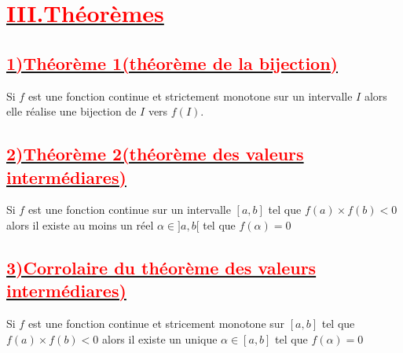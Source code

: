\documentclass[12pt]{article}
\begin{document}

            \section*{\underline{\textbf{\textcolor{red}{III.Théorèmes}}}}
            \subsection*{\underline{\textbf{\textcolor{red}{1)Théorème 1(théorème de la bijection)}}}}
            Si $f$ est une fonction continue et strictement monotone sur un intervalle $I$ alors elle réalise une bijection de $I$ vers $f(I)$.
            \subsection*{\underline{\textbf{\textcolor{red}{2)Théorème 2(théorème des valeurs intermédiares)}}}}
            Si $f$ est une fonction continue sur un intervalle $[a, b]$ tel que $f(a)\times f(b)<0$ alors il existe au moins un réel $\alpha\in ]a, b[$ tel que $f(\alpha)=0$
\subsection*{\underline{\textbf{\textcolor{red}{3)Corrolaire du théorème des valeurs intermédiares)}}}}
Si $f$ est une fonction continue et stricement monotone sur $[a, b]$ tel que $f(a)\times f(b)<0$ alors il existe un unique $\alpha\in [a, b]$ tel que $f(\alpha)=0$
\end{document}
